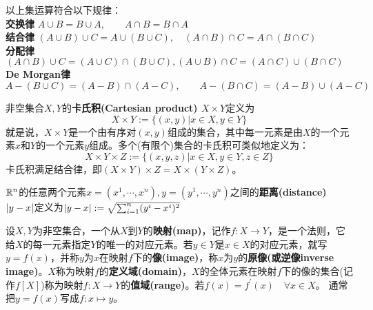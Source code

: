 \documentclass[a4paper]{article}
\begin{document}
\begin{nthm}
    以上集运算符合以下规律： \\
    \textbf{交换律} $ A \cup B = B \cup A, \qquad A \cap B = B \cap A $ \\
    \textbf{结合律} $ (A \cup B) \cup C = A \cup (B \cup C), \quad (A \cap B) \cap C = A \cap (B \cap C) $ \\
    \textbf{分配律} $ (A \cap B) \cup C = (A \cup C) \cap (B \cup C), (A \cup B) \cap C = (A \cap C) \cup (B \cap C) $  \\
    \textbf{De Morgan律} $ A - (B \cup C) = (A - B) \cap (A - C), \qquad A - (B \cap C) = (A - B) \cup (A - C) $
\end{nthm}

\begin{ndefi}
    非空集合$ X,Y $的\textbf{卡氏积(Cartesian product) $ X \times Y $}定义为
    \begin{equation*}
        X \times Y := \{ (x,y) | x \in X , y \in Y \}
    \end{equation*}
    就是说，$ X \times Y $是一个由有序对$ (x,y) $组成的集合，其中每一元素是由$ X $的一个元素$ x $和$ Y $的一个元素$ y $组成。多个(有限个)集合的卡氏积可类似地定义为：
    \begin{equation*}
        X \times Y \times Z := \{ (x,y,z) | x \in X, y \in Y, z \in Z \}
    \end{equation*}
    卡氏积满足结合律，即$ (X \times Y) \times Z = X \times (Y \times Z) $。
\end{ndefi}

\begin{ndefi}
    $ \mathbb{R}^{n} $的任意两个元素$ x=(x^{1}, \cdots, x^{n}), y=(y^{1}, \cdots, y^{n}) $之间的\textbf{距离(distance)}$ \left\lvert y-x\right\rvert $定义为$ \left\lvert y-x\right\rvert:=\sqrt{\sum_{i=1}^{n}(y^{i}-x^{i})^{2}} $
\end{ndefi}

\begin{ndefi}
    设$ X,Y $为非空集合，一个从$ X $到$ Y $的\textbf{映射(map)}，记作$ f: X \to Y $，是一个法则，它给$ X $的每一元素指定$ Y $的唯一的对应元素。若$ y \in Y $是$ x \in X $的对应元素，就写$ y=f(x) $，并称$ y $为$ x $在映射$ f $下的\textbf{像(image)}，称$ x $为$ y $的\textbf{原像(或逆像inverse image)}。$ X $称为映射$ f $的\textbf{定义域(domain)}，$ X $的全体元素在映射$ f $下的像的集合(记作$ f[X] $)称为映射$ f: X \to Y $的\textbf{值域(range)}。若$ f(x)=f^{'}(x) \quad \forall x \in X $。
    通常把$ y=f(x) $写成$ f:x \mapsto y $。
\end{ndefi}
\end{document}
